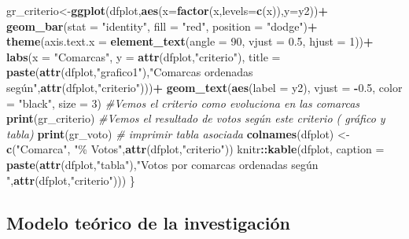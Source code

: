 \documentclass[
]{article}
\newenvironment{Shaded}{\begin{snugshade}}{\end{snugshade}}
\newcommand{\AttributeTok}[1]{\textcolor[rgb]{0.13,0.29,0.53}{#1}}
\newcommand{\CommentTok}[1]{\textcolor[rgb]{0.56,0.35,0.01}{\textit{#1}}}
\newcommand{\DecValTok}[1]{\textcolor[rgb]{0.00,0.00,0.81}{#1}}
\newcommand{\FloatTok}[1]{\textcolor[rgb]{0.00,0.00,0.81}{#1}}
\newcommand{\FunctionTok}[1]{\textcolor[rgb]{0.13,0.29,0.53}{\textbf{#1}}}
\newcommand{\NormalTok}[1]{#1}
\newcommand{\OtherTok}[1]{\textcolor[rgb]{0.56,0.35,0.01}{#1}}
\newcommand{\SpecialCharTok}[1]{\textcolor[rgb]{0.81,0.36,0.00}{\textbf{#1}}}
\newcommand{\StringTok}[1]{\textcolor[rgb]{0.31,0.60,0.02}{#1}}
\begin{document}
\begin{Shaded}
\begin{Highlighting}[]
\NormalTok{gr\_criterio}\OtherTok{\textless{}{-}}\FunctionTok{ggplot}\NormalTok{(dfplot,}\FunctionTok{aes}\NormalTok{(}\AttributeTok{x=}\FunctionTok{factor}\NormalTok{(x,}\AttributeTok{levels=}\FunctionTok{c}\NormalTok{(x)),}\AttributeTok{y=}\NormalTok{y2))}\SpecialCharTok{+}
   \FunctionTok{geom\_bar}\NormalTok{(}\AttributeTok{stat =} \StringTok{"identity"}\NormalTok{, }\AttributeTok{fill =} \StringTok{"red"}\NormalTok{, }\AttributeTok{position =} \StringTok{"dodge"}\NormalTok{)}\SpecialCharTok{+}
   \FunctionTok{theme}\NormalTok{(}\AttributeTok{axis.text.x =} \FunctionTok{element\_text}\NormalTok{(}\AttributeTok{angle =} \DecValTok{90}\NormalTok{, }\AttributeTok{vjust =} \FloatTok{0.5}\NormalTok{, }\AttributeTok{hjust =} \DecValTok{1}\NormalTok{))}\SpecialCharTok{+}
   \FunctionTok{labs}\NormalTok{(}\AttributeTok{x =} \StringTok{"Comarcas"}\NormalTok{, }\AttributeTok{y =} \FunctionTok{attr}\NormalTok{(dfplot,}\StringTok{"criterio"}\NormalTok{), }\AttributeTok{title =} \FunctionTok{paste}\NormalTok{(}\FunctionTok{attr}\NormalTok{(dfplot,}\StringTok{"grafico1"}\NormalTok{),}\StringTok{"Comarcas ordenadas según"}\NormalTok{,}\FunctionTok{attr}\NormalTok{(dfplot,}\StringTok{"criterio"}\NormalTok{)))}\SpecialCharTok{+}
   \FunctionTok{geom\_text}\NormalTok{(}\FunctionTok{aes}\NormalTok{(}\AttributeTok{label =}\NormalTok{ y2), }\AttributeTok{vjust =} \SpecialCharTok{{-}}\FloatTok{0.5}\NormalTok{, }\AttributeTok{color =} \StringTok{"black"}\NormalTok{, }\AttributeTok{size =} \DecValTok{3}\NormalTok{) }
\CommentTok{\#Vemos el criterio como evoluciona en las comarcas}
\FunctionTok{print}\NormalTok{(gr\_criterio)}
\CommentTok{\#Vemos el resultado de votos según este criterio ( gráfico y tabla)}
\FunctionTok{print}\NormalTok{(gr\_voto)}
  \CommentTok{\# imprimir tabla asociada}
\FunctionTok{colnames}\NormalTok{(dfplot) }\OtherTok{\textless{}{-}} \FunctionTok{c}\NormalTok{(}\StringTok{"Comarca"}\NormalTok{, }\StringTok{"\% Votos"}\NormalTok{,}\FunctionTok{attr}\NormalTok{(dfplot,}\StringTok{"criterio"}\NormalTok{))}
\NormalTok{knitr}\SpecialCharTok{::}\FunctionTok{kable}\NormalTok{(dfplot, }\AttributeTok{caption =} \FunctionTok{paste}\NormalTok{(}\FunctionTok{attr}\NormalTok{(dfplot,}\StringTok{"tabla"}\NormalTok{),}\StringTok{"Votos por comarcas ordenadas según "}\NormalTok{,}\FunctionTok{attr}\NormalTok{(dfplot,}\StringTok{"criterio"}\NormalTok{)))}
\NormalTok{  \}}
\end{Highlighting}
\end{Shaded}

\hypertarget{modelo-teuxf3rico-de-la-investigaciuxf3n-1}{%
\subsection{Modelo teórico de la
investigación}\label{modelo-teuxf3rico-de-la-investigaciuxf3n-1}}
\end{document}
